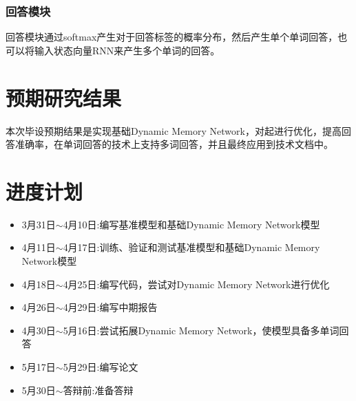 \subsubsection{回答模块}
回答模块通过softmax产生对于回答标签的概率分布，然后产生单个单词回答，也可以将输入状态向量RNN来产生多个单词的回答。
\section{预期研究结果}
本次毕设预期结果是实现基础Dynamic Memory Network，对起进行优化，提高回答准确率，在单词回答的技术上支持多词回答，并且最终应用到技术文档中。
\section{进度计划}
\begin{itemize}
\item 3月31日$\sim$4月10日:编写基准模型和基础Dynamic Memory Network模型 
\item 4月11日$\sim$4月17日:训练、验证和测试基准模型和基础Dynamic Memory Network模型
\item 4月18日$\sim$4月25日:编写代码，尝试对Dynamic Memory Network进行优化
\item 4月26日$\sim$4月29日:编写中期报告
\item 4月30日$\sim$5月16日:尝试拓展Dynamic Memory Network，使模型具备多单词回答
\item 5月17日$\sim$5月29日:编写论文                       
\item 5月30日$\sim$答辩前:准备答辩 
\end{itemize}
